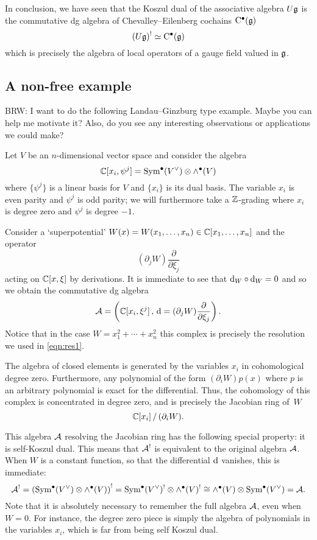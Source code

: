 \documentclass[11pt]{amsart}
\def\brian#1{{\textcolor{blue!65!red}{BRW: {#1}}}}
\begin{document}
In conclusion, we have seen that the Koszul dual of the associative algebra $U \mathfrak g$ is the commutative dg algebra of Chevalley--Eilenberg cochains ${\rm C}^\bullet(\mathfrak g)$
\[
(U \mathfrak g)^! \simeq {\rm C}^\bullet (\mathfrak g) 
\]
which is precisely the algebra of local operators of a gauge field valued in $\mathfrak g$. 

\subsection{A non-free example} 
\label{sec:LG1}

\brian{I want to do the following Landau--Ginzburg type example. Maybe you can help me motivate it?
Also, do you see any interesting observations or applications we could make?}

Let $V$ be an $n$-dimensional vector space and consider the algebra 
\[
\mathbb C[x_i, \psi^j] = \operatorname{Sym}^\bullet (V^\vee) \otimes \wedge^\bullet(V) 
\]
where $\{\psi^j\}$ is a linear basis for $V$ and $\{x_i\}$ is its dual basis.
The variable $x_i$ is even parity and $\psi^j$ is odd parity; we will furthermore take a $\mathbb Z$-grading where $x_i$ is degree zero and $\psi^j$ is degree $-1$. 

Consider a `superpotential' $W(x) = W(x_1,\ldots, x_n) \in \mathbb C[x_1,\ldots, x_n]$ and the operator 
\[
(\partial_j W) \frac{\partial}{\partial \xi_j}
\]
acting on $\mathbb C[x,\xi]$ by derivations. 
It is immediate to see that ${\rm d}_W \circ {\rm d}_W = 0$ and so we obtain the commutative dg algebra 
\[
\mathcal A = \left(\mathbb C[x_i, \xi^j] \, , \, {\rm d} = (\partial_j W) \frac{\partial}{\partial \xi_j} \right).
\]
Notice that in the case $W = x_1^2 + \cdots + x_n^2$ this complex is precisely the resolution we used in \eqref{eqn:res1}. 

The algebra of closed elements is generated by the variables $x_i$ in cohomological degree zero. 
Furthermore, any polynomial of the form $(\partial_i W) p(x)$ where $p$ is an arbitrary polynomial is exact for the differential. 
Thus, the cohomology of this complex is concentrated in degree zero, and is precisely the Jacobian ring of~$W$
\[
\mathbb C[x_i] \, / \, (\partial_i W) .
\]

This algebra $\mathcal A$ resolving the Jacobian ring has the following special property: it is self-Koszul dual. 
This means that $\mathcal A^!$ is equivalent to the original algebra $\mathcal A$. 
When $W$ is a constant function, so that the differential ${\rm d}$ vanishes, this is immediate:
\[
\mathcal A^! = \left(\operatorname{Sym}^\bullet (V^\vee) \otimes \wedge^\bullet(V)\right)^! = \operatorname{Sym}^\bullet (V^\vee)^! \otimes \wedge^\bullet(V)^! \cong \wedge^\bullet (V) \otimes \operatorname{Sym}^\bullet (V^\vee) = \mathcal A .
\]
Note that it is absolutely necessary to remember the full algebra $\mathcal A$, even when $W = 0$. 
For instance, the degree zero piece is simply the algebra of polynomials in the variables $x_i$, which is far from being self Koszul dual.
\end{document}
